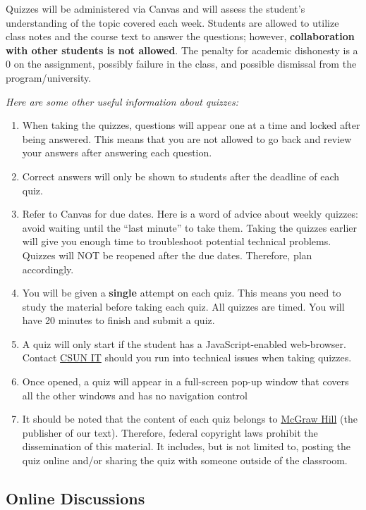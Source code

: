 \documentclass[11pt,]{article}
\begin{document}
Quizzes will be administered via Canvas and will assess the student's
understanding of the topic covered each week. Students are allowed to
utilize class notes and the course text to answer the questions;
however, \textbf{collaboration with other students is not allowed}. The
penalty for academic dishonesty is a 0 on the assignment, possibly
failure in the class, and possible dismissal from the
program/university.

\emph{Here are some other useful information about quizzes:}

\begin{enumerate}
\def\labelenumi{\arabic{enumi}.}
\item
  When taking the quizzes, questions will appear one at a time and
  locked after being answered. This means that you are not allowed to go
  back and review your answers after answering each question.
\item
  Correct answers will only be shown to students after the deadline of
  each quiz.
\item
  Refer to Canvas for due dates. Here is a word of advice about weekly
  quizzes: avoid waiting until the ``last minute'' to take them. Taking
  the quizzes earlier will give you enough time to troubleshoot
  potential technical problems. Quizzes will NOT be reopened after the
  due dates. Therefore, plan accordingly.
\item
  You will be given a \textbf{single} attempt on each quiz. This means
  you need to study the material before taking each quiz. All quizzes
  are timed. You will have 20 minutes to finish and submit a quiz.
\item
  A quiz will only start if the student has a JavaScript-enabled
  web-browser. Contact \href{https://www.csun.edu/it}{CSUN IT} should
  you run into technical issues when taking quizzes.
\item
  Once opened, a quiz will appear in a full-screen pop-up window that
  covers all the other windows and has no navigation control
\item
  It should be noted that the content of each quiz belongs to
  \href{https://www.mheducation.com/}{McGraw Hill} (the publisher of our
  text). Therefore, federal copyright laws prohibit the dissemination of
  this material. It includes, but is not limited to, posting the quiz
  online and/or sharing the quiz with someone outside of the classroom.
\end{enumerate}

\hypertarget{online-discussions}{%
\subsection{Online Discussions}\label{online-discussions}}
\end{document}
